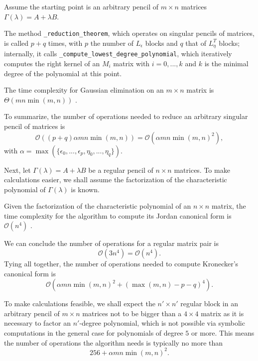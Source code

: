 Assume the starting point is an arbitrary pencil of \(m \times n\) matrices \(\Gamma(\lambda) = A+\lambda B\).

The method \texttt{_reduction_theorem}, which operates on singular pencils of matrices,
is called \(p + q\) times, with \(p\) the number of \(L_\epsilon\) blocks and \(q\)
that of \(L^T_\eta\) blocks; internally, it calls \texttt{_compute_lowest_degree_polynomial}, which
iteratively computes the right kernel of an \(M_i\) matrix with \(i = 0, ..., k\) and \(k\) is the minimal degree
of the polynomial at this point.

\begin{remark}
    The time complexity for Gaussian elimination on an \(m \times n\) matrix is
    \(\Theta(mn \min(m, n))\) \cite{boyd_vandenberghe_2018}.
\end{remark}

To summarize, the number of operations needed to reduce an arbitrary singular pencil of matrices is
\[
    \mathcal{O}((p + q)\alpha mn \min(m, n)) = \mathcal{O}(\alpha mn \min(m, n)^2),
\]
with \(\alpha = \max(\{\epsilon_0, ..., \epsilon_p, \eta_0, ..., \eta_q\})\).

Next, let \(\Gamma(\lambda) = A + \lambda B\) be a regular pencil of \(n \times n\) matrices. To make calculations
easier, we shall assume the factorization of the characteristic polynomial of \(\Gamma(\lambda)\) is known.

\begin{remark}
    Given the factorization of the characteristic polynomial of an \(n \times n\) matrix, the time complexity
    for the algorithm to compute its Jordan canonical form is \(\mathcal{O}(n^4)\)
    \cite{DBLP:journals/corr/abs-cs-0412005}.
\end{remark}

We can conclude the number of operations for a regular matrix pair is
\[
    \mathcal{O}(3n^4) = \mathcal{O}(n^4).
\]
Tying all together, the number of operations needed to compute Kronecker's canonical form is
\[
    \mathcal{O}(\alpha mn \min(m, n)^2 + (\max(m, n) - p - q)^4).
\]

\begin{remark}
    To make calculations feasible, we shall expect the \(n' \times n'\) regular block in an arbitrary pencil of
    \(m \times n\) matrices not to be bigger than a \(4 \times 4\) matrix as it is necessary to factor an
    \(n'\)-degree polynomial, which is not possible via symbolic computations in the general case for polynomials
    of degree \(5\) or more. This means the number of operations the algorithm needs is typically no more than
    \[
        256 + \alpha mn \min(m, n)^2.
    \]
\end{remark}

